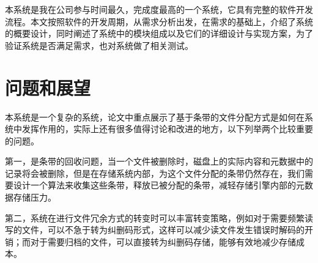 本系统是我在公司参与时间最久，完成度最高的一个系统，它具有完整的软件开发流程。本文按照软件的开发周期，从需求分析出发，在需求的基础上，介绍了系统的概要设计，同时阐述了系统中的模块组成以及它们的详细设计与实现方案，为了验证系统是否满足需求，也对系统做了相关测试。

\section{问题和展望}%
本系统是一个复杂的系统，论文中重点展示了基于条带的文件分配方式是如何在系统中发挥作用的，实际上还有很多值得讨论和改进的地方，以下列举两个比较重要的问题。

第一，是条带的回收问题，当一个文件被删除时，磁盘上的实际内容和元数据中的记录将会被删除，但是在存储系统内部，为这个文件分配的条带仍然存在，我们需要设计一个算法来收集这些条带，释放已被分配的条带，减轻存储引擎内部的元数据存储压力。

第二，系统在进行文件冗余方式的转变时可以丰富转变策略，例如对于需要频繁读写的文件，可以不急于转为纠删码形式，这样可以减少读文件发生错误时解码的开销；而对于需要归档的文件，可以直接转为纠删码存储，能够有效地减少存储成本。
